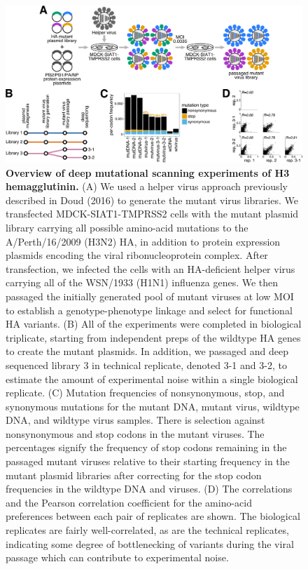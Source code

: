 \documentclass[11pt]{article}
\begin{document}
\begin{figure}
\centerline{\includegraphics[width=\textwidth]{figs/dms_overview/dms_overview.pdf}}
\caption{\label{fig:dms_overview}
{\bf Overview of deep mutational scanning experiments of H3 hemagglutinin.}
(A) We used a helper virus approach previously described in Doud (2016) to generate the mutant virus libraries. 
We transfected MDCK-SIAT1-TMPRSS2 cells with the mutant plasmid library carrying all possible amino-acid mutations to the A/Perth/16/2009 (H3N2) HA, in addition to protein expression plasmids encoding the viral ribonucleoprotein complex. 
After transfection, we infected the cells with an HA-deficient helper virus carrying all of the WSN/1933 (H1N1) influenza genes. 
We then passaged the initially generated pool of mutant viruses at low MOI to establish a genotype-phenotype linkage and select for functional HA variants. 
(B) All of the experiments were completed in biological triplicate, starting from independent preps of the wildtype HA genes to create the mutant plasmids. 
In addition, we passaged and deep sequenced library 3 in technical replicate, denoted 3-1 and 3-2, to estimate the amount of experimental noise within a single biological replicate.
(C) Mutation frequencies of nonsynonymous, stop, and synonymous mutations for the mutant DNA, mutant virus, wildtype DNA, and wildtype virus samples. 
There is selection against nonsynonymous and stop codons in the mutant viruses. 
The percentages signify the frequency of stop codons remaining in the passaged mutant viruses relative to their starting frequency in the mutant plasmid libraries after correcting for the stop codon frequencies in the wildtype DNA and viruses.
(D) The correlations and the Pearson correlation coefficient for the amino-acid preferences between each pair of replicates are shown. 
The biological replicates are fairly well-correlated, as are the technical replicates, indicating some degree of bottlenecking of variants during the viral passage which can contribute to experimental noise. 
}
\end{figure}
\end{document}
